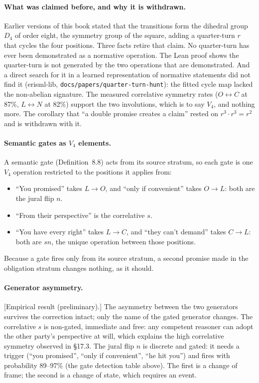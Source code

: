 \paragraph{What was claimed before, and why it is withdrawn.} Earlier versions of this book stated
that the transitions form the dihedral group $D_4$ of order eight, the symmetry group of the
square, adding a quarter-turn $r$ that cycles the four positions. Three facts retire that claim.
No quarter-turn has ever been demonstrated as a normative operation. The Lean proof shows the
quarter-turn is not generated by the two operations that are demonstrated. And a direct search
for it in a learned representation of normative statements did not find it (erisml-lib,
\texttt{docs/papers/quarter-turn-hunt}): the fitted cycle map lacked the non-abelian signature.
The measured correlative symmetry rates ($O \leftrightarrow C$ at 87\%, $L \leftrightarrow N$ at
82\%) support the two involutions, which is to say $V_4$, and nothing more. The corollary that
``a double promise creates a claim'' rested on $r^3 \cdot r^3 = r^2$ and is withdrawn with it.

\paragraph{Semantic gates as $V_4$ elements.} A semantic gate (Definition~8.8) acts from its
source stratum, so each gate is one $V_4$ operation restricted to the positions it applies from:
\begin{itemize}
  \item ``You promised'' takes $L \to O$, and ``only if convenient'' takes $O \to L$: both are the
        jural flip $n$.
  \item ``From their perspective'' is the correlative $s$.
  \item ``You have every right'' takes $L \to C$, and ``they can't demand'' takes $C \to L$: both are
        $sn$, the unique operation between those positions.
\end{itemize}
Because a gate fires only from its source stratum, a second promise made in the obligation stratum
changes nothing, as it should.

\paragraph{Generator asymmetry.} [Empirical result (preliminary).] The asymmetry between the two
generators survives the correction intact; only the name of the gated generator changes. The
correlative $s$ is non-gated, immediate and free: any competent reasoner can adopt the other
party's perspective at will, which explains the high correlative symmetry observed in
\S17.3. The jural flip $n$ is discrete and gated: it needs a trigger (``you promised'', ``only if
convenient'', ``he hit you'') and fires with probability 89--97\% (the gate detection table above).
The first is a change of frame; the second is a change of state, which requires an event.

